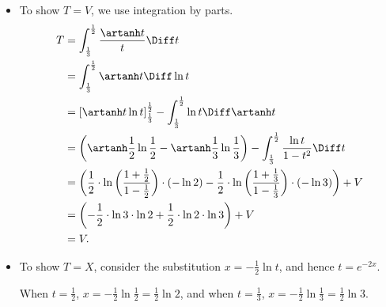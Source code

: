 \begin{itemize}
    \item To show \(T = V\), we use integration by parts.
          \begin{align*}
              T & = \int_{\frac{1}{3}}^{\frac{1}{2}} \frac{\artanh t}{t} \Diff t                                                                                                                                            \\
                & = \int_{\frac{1}{3}}^{\frac{1}{2}} \artanh t \Diff \ln t                                                                                                                                                  \\
                & = \left[\artanh t \ln t\right]_{\frac{1}{3}}^{\frac{1}{2}} - \int_{\frac{1}{3}}^{\frac{1}{2}} \ln t \Diff \artanh t                                                                                       \\
                & = \left(\artanh \frac{1}{2} \ln \frac{1}{2} - \artanh \frac{1}{3} \ln \frac{1}{3}\right) - \int_{\frac{1}{3}}^{\frac{1}{2}} \frac{\ln t}{1 - t^2} \Diff t                                                 \\
                & = \left(\frac{1}{2} \cdot \ln \left(\frac{1 + \frac{1}{2}}{1 - \frac{1}{2}}\right) \cdot (- \ln 2) - \frac{1}{2} \cdot \ln \left(\frac{1 + \frac{1}{3}}{1 - \frac{1}{3}}\right) \cdot (-\ln 3)\right) + V \\
                & = \left(- \frac{1}{2} \cdot \ln 3 \cdot \ln 2 + \frac{1}{2} \cdot \ln 2 \cdot \ln 3\right) + V                                                                                                            \\
                & = V.
          \end{align*}

    \item To show \(T = X\), consider the substitution \(x = - \frac{1}{2} \ln t\), and hence \(t = e^{-2x}\).

          When \(t = \frac{1}{2}\), \(x = - \frac{1}{2} \ln \frac{1}{2} = \frac{1}{2} \ln 2\), and when \(t = \frac{1}{3}\), \(x = - \frac{1}{2} \ln \frac{1}{3} = \frac{1}{2} \ln 3\).


\end{itemize}
